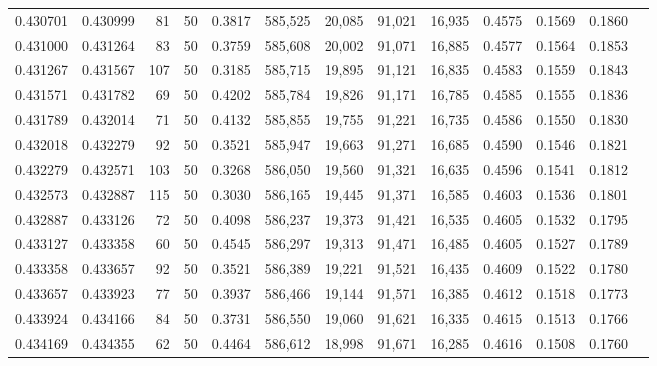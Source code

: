 \begin{tabular}{rrrrrrrrrrrrr}
0.430701 & 0.430999 &    81 &  50 &                                     0.3817 & 585,525 &  20,085 &  91,021 &  16,935 & 0.4575 & 0.1569 & 0.1860 \\
0.431000 & 0.431264 &    83 &  50 &                                     0.3759 & 585,608 &  20,002 &  91,071 &  16,885 & 0.4577 & 0.1564 & 0.1853 \\
0.431267 & 0.431567 &   107 &  50 &                                     0.3185 & 585,715 &  19,895 &  91,121 &  16,835 & 0.4583 & 0.1559 & 0.1843 \\
0.431571 & 0.431782 &    69 &  50 &                                     0.4202 & 585,784 &  19,826 &  91,171 &  16,785 & 0.4585 & 0.1555 & 0.1836 \\
0.431789 & 0.432014 &    71 &  50 &                                     0.4132 & 585,855 &  19,755 &  91,221 &  16,735 & 0.4586 & 0.1550 & 0.1830 \\
0.432018 & 0.432279 &    92 &  50 &                                     0.3521 & 585,947 &  19,663 &  91,271 &  16,685 & 0.4590 & 0.1546 & 0.1821 \\
0.432279 & 0.432571 &   103 &  50 &                                     0.3268 & 586,050 &  19,560 &  91,321 &  16,635 & 0.4596 & 0.1541 & 0.1812 \\
0.432573 & 0.432887 &   115 &  50 &                                     0.3030 & 586,165 &  19,445 &  91,371 &  16,585 & 0.4603 & 0.1536 & 0.1801 \\
0.432887 & 0.433126 &    72 &  50 &                                     0.4098 & 586,237 &  19,373 &  91,421 &  16,535 & 0.4605 & 0.1532 & 0.1795 \\
0.433127 & 0.433358 &    60 &  50 &                                     0.4545 & 586,297 &  19,313 &  91,471 &  16,485 & 0.4605 & 0.1527 & 0.1789 \\
0.433358 & 0.433657 &    92 &  50 &                                     0.3521 & 586,389 &  19,221 &  91,521 &  16,435 & 0.4609 & 0.1522 & 0.1780 \\
0.433657 & 0.433923 &    77 &  50 &                                     0.3937 & 586,466 &  19,144 &  91,571 &  16,385 & 0.4612 & 0.1518 & 0.1773 \\
0.433924 & 0.434166 &    84 &  50 &                                     0.3731 & 586,550 &  19,060 &  91,621 &  16,335 & 0.4615 & 0.1513 & 0.1766 \\
0.434169 & 0.434355 &    62 &  50 &                                     0.4464 & 586,612 &  18,998 &  91,671 &  16,285 & 0.4616 & 0.1508 & 0.1760 \\

\end{tabular}

